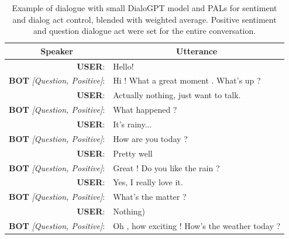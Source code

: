 \documentclass[11pt]{article}
\begin{document}
\begin{table}[]
\begin{tabular}{rl}
\multicolumn{1}{c}{Speaker}   & \multicolumn{1}{c}{Utterance}                 \\ \hline
\textbf{USER}:                         & Hello!                                        \\
\textbf{BOT} \textit{{[}Question, Positive{]}}: & Hi ! What a great moment . What's up ?        \\
\textbf{USER}:                         & Actually nothing, just want to talk.          \\
\textbf{BOT} \textit{{[}Question, Positive{]}}: & What happened ?                               \\
\textbf{USER}:                         & It's rainy...                                 \\
\textbf{BOT} \textit{{[}Question, Positive{]}}: & How are you today ?                           \\
\textbf{USER}:                         & Pretty well                                   \\
\textbf{BOT} \textit{{[}Question, Positive{]}}: & Great ! Do you like the rain ?                \\
\textbf{USER}:                         & Yes, I really love it.                        \\
\textbf{BOT} \textit{{[}Question, Positive{]}}: & What's the matter ?                           \\
\textbf{USER}:                         & Nothing)                                      \\
\textbf{BOT} \textit{{[}Question, Positive{]}}: & Oh , how exciting ! How's the weather today ?
\end{tabular}
\caption{Example of dialogue with small DialoGPT model and PALs for sentiment and dialog act control, blended with weighted average. Positive sentiment and question dialogue act were set for the entire conversation.}
\label{tab:example_pos_question_dialogue}
\end{table}
\end{document}
